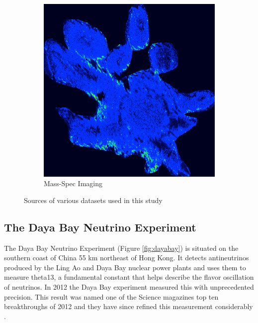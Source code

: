 \begin{figure}
\begin{subfigure}[b]{0.22\textwidth}
\includegraphics[width=\textwidth]{fig/mass-spec.png}
\caption{Mass-Spec Imaging}
\label{fig:mass-spec}
\end{subfigure}
\caption{Sources of various datasets used in this study}\label{fig:datasets}
\end{figure}

\subsection{The Daya Bay Neutrino Experiment}
The Daya Bay Neutrino Experiment (Figure \ref{fig:dayabay}) is situated on the southern coast of China 55 km northeast of Hong Kong. It detects antineutrinos produced by the Ling Ao and Daya Bay nuclear power plants and uses them to measure theta13, a fundamental constant that helps describe the flavor oscillation of neutrinos. In 2012 the Daya Bay experiment measured this with unprecedented precision. This result was named one of the Science magazines top ten breakthroughs of 2012 and they have since refined this measurement considerably \cite{dayabay15}.


